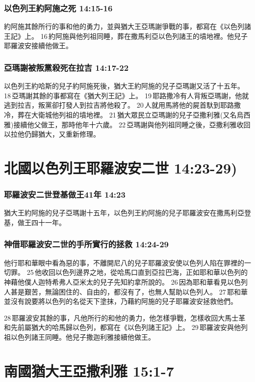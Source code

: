 \subsubsection{以色列王約阿施之死 14:15-16 }
約阿施其餘所行的事和他的勇力，並與猶大王亞瑪謝爭戰的事，都寫在《以色列諸王記》上。 16 約阿施與他列祖同睡，葬在撒馬利亞以色列諸王的墳地裡。他兒子耶羅波安接續他做王。

\subsubsection{亞瑪謝被叛黨殺死在拉吉 14:17-22 }
以色列王約哈斯的兒子約阿施死後，猶大王約阿施的兒子亞瑪謝又活了十五年。 18 亞瑪謝其餘的事都寫在《猶大列王記》上。 19 耶路撒冷有人背叛亞瑪謝，他就逃到拉吉，叛黨卻打發人到拉吉將他殺了。 20 人就用馬將他的屍首馱到耶路撒冷，葬在大衛城他列祖的墳地裡。 21 猶大眾民立亞瑪謝的兒子亞撒利雅(又名烏西雅)接續他父做王，那時他年十六歲。 22 亞瑪謝與他列祖同睡之後，亞撒利雅收回以拉他仍歸猶大，又重新修理。

\section{北國以色列王耶羅波安二世 14:23-29)}
\subsubsection{耶羅波安二世登基做王41年 14:23 }
猶大王約阿施的兒子亞瑪謝十五年，以色列王約阿施的兒子耶羅波安在撒馬利亞登基，做王四十一年。

\subsubsection{神借耶羅波安二世的手所實行的拯救 14:24-29}
他行耶和華眼中看為惡的事，不離開尼八的兒子耶羅波安使以色列人陷在罪裡的一切罪。 25 他收回以色列邊界之地，從哈馬口直到亞拉巴海，正如耶和華以色列的神藉他僕人迦特希弗人亞米太的兒子先知約拿所說的。 26 因為耶和華看見以色列人甚是艱苦，無論困住的、自由的，都沒有了，也無人幫助以色列人。 27 耶和華並沒有說要將以色列的名從天下塗抹，乃藉約阿施的兒子耶羅波安拯救他們。

28 耶羅波安其餘的事，凡他所行的和他的勇力，他怎樣爭戰，怎樣收回大馬士革和先前屬猶大的哈馬歸以色列，都寫在《以色列諸王記》上。 29 耶羅波安與他列祖以色列諸王同睡。他兒子撒迦利雅接續他做王。


\section{南國猶大王亞撒利雅 15:1-7 }
